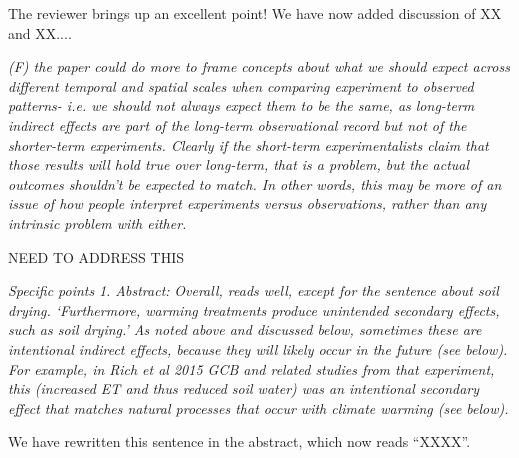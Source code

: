 \documentclass[11pt,a4paper]{letter}
\begin{document}
\begin{letter}{}
The reviewer brings up an excellent point! We have now added discussion of XX and XX....

\emph{(F) the paper could do more to frame concepts about what we should expect across different temporal and spatial scales when comparing experiment to observed patterns- i.e. we should not always expect them to be the same, as long-term indirect effects are part of the long-term observational record but not of the shorter-term experiments. Clearly if the short-term experimentalists claim that those results will hold true over long-term, that is a problem, but the actual outcomes shouldn't be expected to match. In other words, this may be more of an issue of how people interpret experiments versus observations, rather than any intrinsic problem with either.}

NEED TO ADDRESS THIS

\emph{Specific points}
\emph{1. Abstract:}
\emph{Overall, reads well, except for the sentence about soil drying. `Furthermore, warming treatments produce unintended secondary effects, such as soil drying.' As noted above and discussed below, sometimes these are intentional indirect effects, because they will likely occur in the future (see below). For example, in Rich et al 2015 GCB and related studies from that experiment, this (increased ET and thus reduced soil water) was an intentional secondary effect that matches natural processes that occur with climate warming (see below).}

We have rewritten this sentence in the abstract, which now reads ``XXXX''.


\end{letter}
\end{document}
